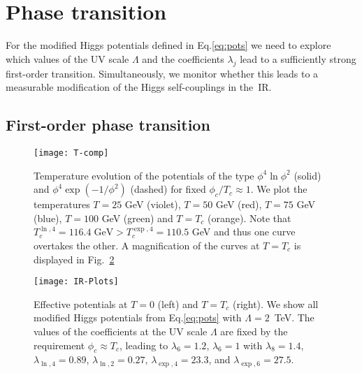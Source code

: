 \documentclass[aps,prd,11pt,tightenlines,superscriptaddress,nofootinbib,preprintnumbers,notitlepage]{revtex4-1}
\begin{document}
\section{Phase transition}
\label{sec:main}

For the modified Higgs potentials defined in Eq.\eqref{eq:pots} we
need to explore which values of the UV scale $\Lambda$ and the
coefficients $\lambda_j$ lead to a sufficiently strong first-order
transition. Simultaneously, we monitor whether this leads to a
measurable modification of the Higgs self-couplings in the~IR.

\subsection{First-order phase transition}
\label{sec:pt}


\begin{figure}[t]
 \centering
 \texttt{[image: T-comp]}
 \caption{Temperature evolution of the potentials of the type
   $\phi^4 \ln\phi^2$ (solid) and $\phi^4 \exp(-1/\phi^2)$ (dashed)
   for fixed $\phi_c/T_c\approx1$.  We plot the temperatures $T=25$
   GeV (violet), $T=50$ GeV (red), $T=75$ GeV (blue), $T=100$ GeV
   (green) and $T=T_c$ (orange). Note that
   $T_c^{\ln,4} = 116.4\;\mathrm{GeV} > T_c^{\exp,4} = 110.5$ GeV and
   thus one curve overtakes the other.  A magnification of the curves
   at $T=T_c$ is displayed in Fig.~\ref{fig:IR-plots} }
 \label{fig:T-comp}
\end{figure}

\begin{figure}[t]
 \texttt{[image: IR-Plots]}
 \caption{Effective potentials at $T=0$ (left) and $T=T_c$ (right). We
   show all modified Higgs potentials from Eq.\eqref{eq:pots} with
   $\Lambda=2$~TeV. The values of the coefficients at the UV scale
   $\Lambda$ are fixed by the requirement $\phi_c \approx T_c$,
   leading to $\lambda_6=1.2$, $\lambda_6=1$ with $\lambda_8=1.4$,
   $\lambda_{\ln,4}=0.89$, $\lambda_{\ln,2}=0.27$,
   $\lambda_{\exp,4}=23.3$, and $\lambda_{\exp,6}=27.5$.}
 \label{fig:IR-plots}
\end{figure}
\end{document}
